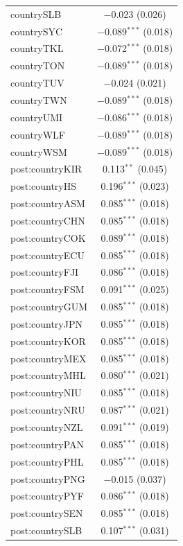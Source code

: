 \documentclass[12pt,]{article}
\begin{document}
\begin{table}[!htbp]
\begin{tabular}{@{\extracolsep{5pt}}lc}
  countrySLB & $-$0.023 (0.026) \\ 
  countrySYC & $-$0.089$^{***}$ (0.018) \\ 
  countryTKL & $-$0.072$^{***}$ (0.018) \\ 
  countryTON & $-$0.089$^{***}$ (0.018) \\ 
  countryTUV & $-$0.024 (0.021) \\ 
  countryTWN & $-$0.089$^{***}$ (0.018) \\ 
  countryUMI & $-$0.086$^{***}$ (0.018) \\ 
  countryWLF & $-$0.089$^{***}$ (0.018) \\ 
  countryWSM & $-$0.089$^{***}$ (0.018) \\ 
  post:countryKIR & 0.113$^{**}$ (0.045) \\ 
  post:countryHS & 0.196$^{***}$ (0.023) \\ 
  post:countryASM & 0.085$^{***}$ (0.018) \\ 
  post:countryCHN & 0.085$^{***}$ (0.018) \\ 
  post:countryCOK & 0.089$^{***}$ (0.018) \\ 
  post:countryECU & 0.085$^{***}$ (0.018) \\ 
  post:countryFJI & 0.086$^{***}$ (0.018) \\ 
  post:countryFSM & 0.091$^{***}$ (0.025) \\ 
  post:countryGUM & 0.085$^{***}$ (0.018) \\ 
  post:countryJPN & 0.085$^{***}$ (0.018) \\ 
  post:countryKOR & 0.085$^{***}$ (0.018) \\ 
  post:countryMEX & 0.085$^{***}$ (0.018) \\ 
  post:countryMHL & 0.080$^{***}$ (0.021) \\ 
  post:countryNIU & 0.085$^{***}$ (0.018) \\ 
  post:countryNRU & 0.087$^{***}$ (0.021) \\ 
  post:countryNZL & 0.091$^{***}$ (0.019) \\ 
  post:countryPAN & 0.085$^{***}$ (0.018) \\ 
  post:countryPHL & 0.085$^{***}$ (0.018) \\ 
  post:countryPNG & $-$0.015 (0.037) \\ 
  post:countryPYF & 0.086$^{***}$ (0.018) \\ 
  post:countrySEN & 0.085$^{***}$ (0.018) \\ 
  post:countrySLB & 0.107$^{***}$ (0.031) \\ 

\end{tabular}
\end{table}
\end{document}

